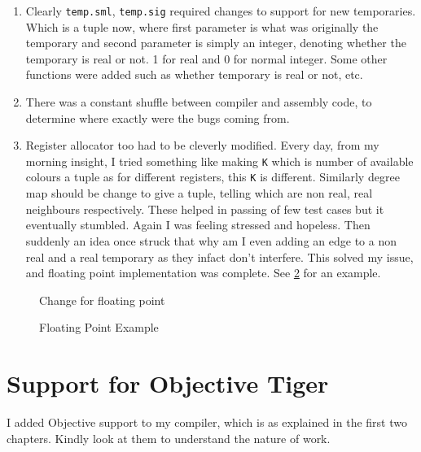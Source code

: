 \begin{enumerate}
  \item Clearly \texttt{temp.sml}, \texttt{temp.sig} required changes to support for new temporaries. Which is a tuple now, where first parameter is what was originally the temporary and second parameter is simply an integer, denoting whether the temporary is real or not. 1 for real and 0 for normal integer. Some other functions were added such as whether temporary is real or not, etc.
  \item There was a constant shuffle between compiler and assembly code, to determine where exactly were the bugs coming from.
  \item Register allocator too had to be cleverly modified. Every day, from my morning insight, I tried something like making \texttt{K} which is number of available colours a tuple as for different registers, this \texttt{K} is different. Similarly degree map should be change to give a tuple, telling which are non real, real neighbours respectively. These helped in passing of few test cases but it eventually stumbled. Again I was feeling stressed and hopeless. Then suddenly an idea once struck that why am I even adding an edge to a non real and a real temporary as they infact don't interfere. This solved my issue, and floating point implementation was complete. See \ref{fig:ft2} for an example.
\end{enumerate}

\begin{figure}
\centering
{}
\caption{Change for floating point}
\label{fig:ft1}
\end{figure}


\begin{figure}
\centering
{}
\caption{Floating Point Example}
\label{fig:ft2}
\end{figure}

\section{Support for Objective Tiger}

I added Objective support to my compiler, which is as explained in the first two chapters. Kindly look at them to understand the nature of work.